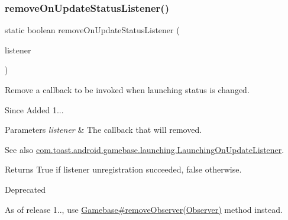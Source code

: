 \subsubsection{\texorpdfstring{remove\+On\+Update\+Status\+Listener()}{removeOnUpdateStatusListener()}}
{\footnotesize\ttfamily static boolean remove\+On\+Update\+Status\+Listener (\begin{DoxyParamCaption}\item[{final Launching\+On\+Update\+Listener}]{listener }\end{DoxyParamCaption})\hspace{0.3cm}{\ttfamily [static]}}



Remove a callback to be invoked when launching status is changed. 

\begin{DoxySince}{Since}
Added 1... 
\end{DoxySince}

\begin{DoxyParams}{Parameters}
{\em listener} & The callback that will removed. \\
\hline
\end{DoxyParams}
\begin{DoxySeeAlso}{See also}
\hyperlink{}{com.\+toast.\+android.\+gamebase.\+launching.\+Launching\+On\+Update\+Listener}. 
\end{DoxySeeAlso}
\begin{DoxyReturn}{Returns}
True if listener unregistration succeeded, false otherwise. 
\end{DoxyReturn}
\begin{DoxyRefDesc}{Deprecated}
\item[\hyperlink{deprecated__deprecated000004}{Deprecated}]As of release 1.., use \hyperlink{classcom_1_1toast_1_1android_1_1gamebase_1_1_gamebase_af13c08393910fc1b5dac3b5209f461c8}{Gamebase\#remove\+Observer(\+Observer)} method instead. \end{DoxyRefDesc}
